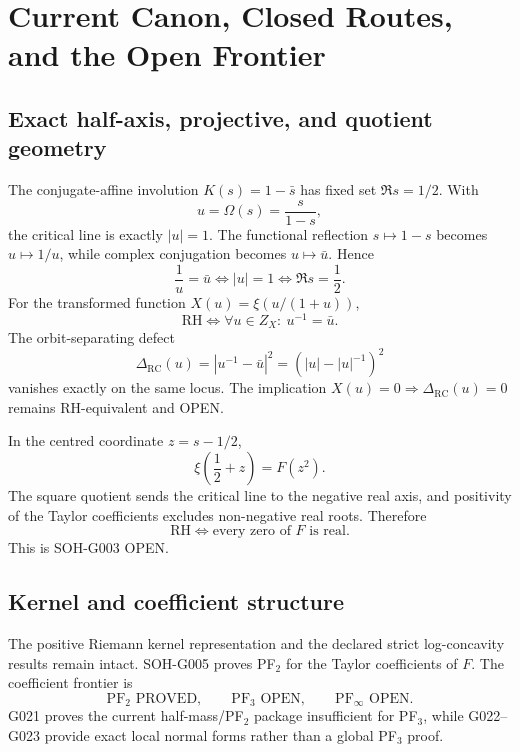 \chapter{Current Canon, Closed Routes, and the Open Frontier}
\label{chap:current-canon-final}


\section{Exact half-axis, projective, and quotient geometry}
The conjugate-affine involution $K(s)=1-\bar s$ has fixed set $\Re s=1/2$. With
\[
u=\Omega(s)=\frac{s}{1-s},
\]
the critical line is exactly $|u|=1$. The functional reflection $s\mapsto1-s$ becomes $u\mapsto1/u$, while complex conjugation becomes $u\mapsto\bar u$. Hence
\[
\boxed{\frac1u=\bar u\iff |u|=1\iff\Re s=\frac12.}
\]
For the transformed function $X(u)=\xi(u/(1+u))$,
\[
\boxed{\mathrm{RH}\iff \forall u\in Z_X:\ u^{-1}=\bar u.}
\]
The orbit-separating defect
\[
\Delta_{\mathrm{RC}}(u)=\left|u^{-1}-\bar u\right|^2
=\left(|u|-|u|^{-1}\right)^2
\]
vanishes exactly on the same locus. The implication $X(u)=0\Rightarrow\Delta_{\mathrm{RC}}(u)=0$ remains RH-equivalent and OPEN.

In the centred coordinate $z=s-1/2$,
\[
\boxed{\xi\!\left(\frac12+z\right)=F(z^2)}.
\]
The square quotient sends the critical line to the negative real axis, and positivity of the Taylor coefficients excludes non-negative real roots. Therefore
\[
\boxed{\mathrm{RH}\iff\text{every zero of }F\text{ is real}.}
\]
This is SOH-G003 OPEN.

\section{Kernel and coefficient structure}
The positive Riemann kernel representation and the declared strict log-concavity results remain intact. SOH-G005 proves PF$_2$ for the Taylor coefficients of $F$. The coefficient frontier is
\[
\boxed{\mathrm{PF}_2\text{ PROVED}},\qquad
\boxed{\mathrm{PF}_3\text{ OPEN}},\qquad
\boxed{\mathrm{PF}_\infty\text{ OPEN}}.
\]
G021 proves the current half-mass/PF$_2$ package insufficient for PF$_3$, while G022--G023 provide exact local normal forms rather than a global PF$_3$ proof.

